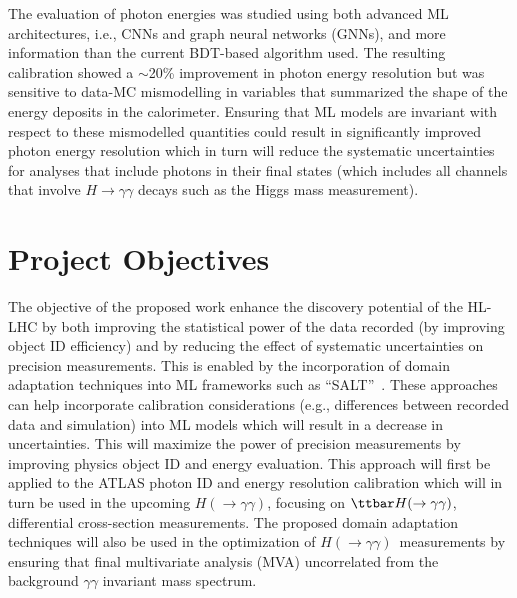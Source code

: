 \documentclass[letter, USenglish, 11pt, subfigure]{article}
\newcommand{\tthyy}{\ensuremath{\ttbar H(\to\gamma\gamma)}}
\newcommand{\hyy}{\ensuremath{H(\to\gamma\gamma)}}
\begin{document}
The evaluation of photon energies was studied using both advanced ML architectures, i.e., CNNs and graph neural networks (GNNs), and more information than the current BDT-based algorithm used. The resulting calibration showed a $\sim$20\% improvement in photon energy resolution but was sensitive to data-MC mismodelling in variables that summarized the shape of the energy deposits in the calorimeter. Ensuring that ML models are invariant with respect to these mismodelled quantities could result in significantly improved photon energy resolution which in turn will reduce the systematic uncertainties for analyses that include photons in their final states (which includes all channels that involve $H\to\gamma\gamma$ decays such as the Higgs mass measurement).

\section{Project Objectives}
The objective of the proposed work enhance the discovery potential of the HL-LHC by both improving the statistical power of the data recorded (by improving object ID efficiency) and by reducing the effect of systematic uncertainties on precision measurements. This is enabled by the incorporation of domain adaptation techniques into ML frameworks such as ``SALT''~\cite{salt}. These approaches can help incorporate calibration considerations (e.g., differences between recorded data and simulation) into ML models which will result in a decrease in uncertainties. This will maximize the power of precision measurements by improving physics object ID and energy evaluation. This approach will first be applied to the ATLAS photon ID and energy resolution calibration which will in turn be used in the upcoming \hyy, focusing on \tthyy, differential cross-section measurements. The proposed domain adaptation techniques will also be used in the optimization of \hyy\ measurements by ensuring that final multivariate analysis (MVA) uncorrelated from the background $\gamma\gamma$ invariant mass spectrum. 
\end{document}
